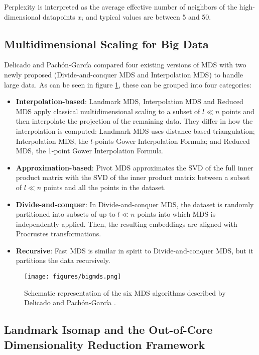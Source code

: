 Perplexity is interpreted as the average effective number of neighbors of the high-dimensional datapoints $x_i$ and typical values are between 5 and 50.

\subsection{Multidimensional Scaling for Big Data}

Delicado and Pachón-García \cite{Delicado2024MDSBigData} compared four existing versions of MDS with two newly proposed (Divide-and-conquer MDS and Interpolation MDS) to handle large data. As can be seen in figure \ref{fig:bigmds}, these can be grouped into four categories:

\begin{itemize}
    \item \textbf{Interpolation-based}: Landmark MDS, Interpolation MDS and Reduced MDS apply classical multidimensional scaling to a subset of $l \ll n$ points and then interpolate the projection of the remaining data. They differ in how the interpolation is computed: Landmark MDS uses distance-based triangulation; Interpolation MDS, the $l$-points Gower Interpolation Formula; and Reduced MDS, the 1-point Gower Interpolation Formula.
    \item \textbf{Approximation-based}: Pivot MDS approximates the SVD of the full inner product matrix with the SVD of the inner product matrix between a subset of $l \ll n$ points and all the points in the dataset.
    \item \textbf{Divide-and-conquer}: In Divide-and-conquer MDS, the dataset is randomly partitioned into subsets of up to $l \ll n$ points into which MDS is independently applied. Then, the resulting embeddings are aligned with Procrustes transformations.
    \item \textbf{Recursive}: Fast MDS is similar in spirit to Divide-and-conquer MDS, but it partitions the data recursively. 
\end{itemize}

\begin{figure}[ht]
    \centering
    \texttt{[image: figures/bigmds.png]}
    \caption{Schematic representation of the six MDS algorithms described by Delicado and Pachón-García \cite{Delicado2024MDSBigData}.}
    \label{fig:bigmds}
\end{figure}

\subsection{Landmark Isomap and the Out-of-Core Dimensionality Reduction Framework}

